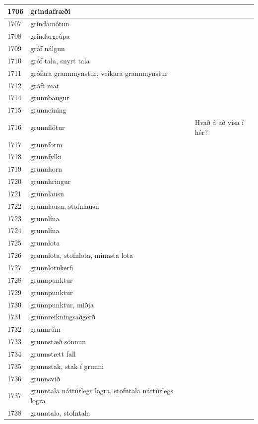 \begin{longtable}{p{}|p{}|p{}|p{}|p{}}
1706 & grindafræði &  &  &  \\
\hline
1707 & grindamótun &  &  &  \\
\hline
1708 & grindargrúpa &  &  &  \\
\hline
1709 & gróf nálgun &  &  &  \\
\hline
1710 & gróf tala, snyrt tala &  &  &  \\
\hline
1711 & grófara grannmynstur, veikara grannmynstur &  &  &  \\
\hline
1712 & gróft mat &  &  &  \\
\hline
1714 & grunnbaugur &  &  &  \\
\hline
1715 & grunneining &  &  &  \\
\hline
1716 & grunnflötur &  &  & Hvað á að vísa í hér? \\
\hline
1717 & grunnform &  &  &  \\
\hline
1718 & grunnfylki &  &  &  \\
\hline
1719 & grunnhorn &  &  &  \\
\hline
1720 & grunnhringur &  &  &  \\
\hline
1721 & grunnlausn &  &  &  \\
\hline
1722 & grunnlausn, stofnlausn &  &  &  \\
\hline
1723 & grunnlína & &  &  \\
\hline
1724 & grunnlína &  &  &  \\
\hline
1725 & grunnlota &  &  &  \\
\hline
1726 & grunnlota, stofnlota, minnsta lota &  &  &  \\
\hline
1727 & grunnlotukerfi &  &  &  \\
\hline
1728 & grunnpunktur &  &  &  \\
\hline
1729 & grunnpunktur &  &  &  \\
\hline
1730 & grunnpunktur, miðja &  &  &  \\
\hline
1731 & grunnreikningsaðgerð &  &  &  \\
\hline
1732 & grunnrúm &  &  &  \\
\hline
1733 & grunnstæð sönnun &  &  &  \\
\hline
1734 & grunnstætt fall &  &  &  \\
\hline
1735 & grunnstak, stak í grunni &  &  &  \\
\hline
1736 & grunnsvið &  &  &  \\
\hline
1737 & grunntala náttúrlegs logra, stofntala náttúrlegs logra &  &  &  \\
\hline
1738 & grunntala, stofntala & &  &  \\

\end{longtable}
